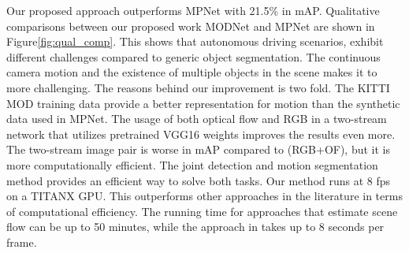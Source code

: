 \documentclass[letterpaper, 10 pt, conference]{ieeeconf}  %
\begin{document}
Our proposed approach outperforms MPNet with 21.5\% in mAP. Qualitative comparisons between our proposed work MODNet and MPNet are shown in Figure\ref{fig:qual_comp}. This shows that autonomous driving scenarios, exhibit different challenges compared to generic object segmentation. The continuous camera motion and the existence of multiple objects in the scene makes it to more challenging. The reasons behind our improvement is two fold. The KITTI MOD training data provide a better representation for motion than the synthetic data used in MPNet. The usage of both optical flow and RGB in a two-stream network that utilizes pretrained VGG16 weights improves the results even more. The two-stream image pair is worse in mAP compared to (RGB+OF), but it is more computationally efficient. The joint detection and motion segmentation method provides an efficient way to solve both tasks. Our method runs at 8 fps on a TITANX GPU. This outperforms other approaches in the literature in terms of computational efficiency. The running time for approaches that estimate scene flow can be up to 50 minutes, while the approach in \cite{drayer2016object} takes up to 8 seconds per frame.
\end{document}

